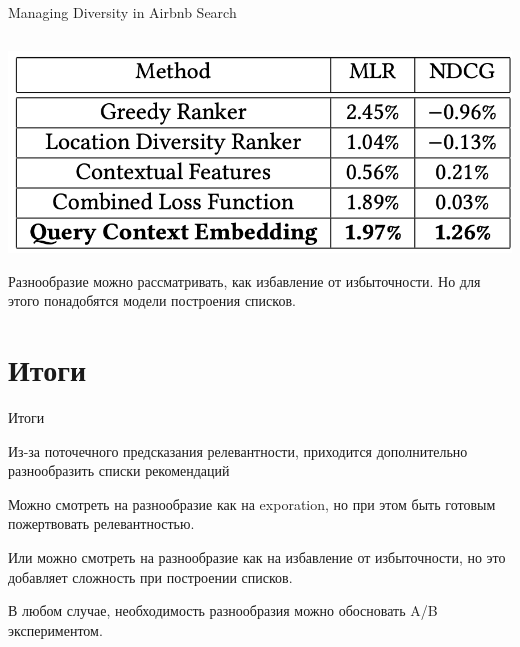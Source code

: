 \documentclass[11pt,aspectratio=169,handout]{beamer}
\begin{document}
\begin{frame}{Managing Diversity in Airbnb Search \cite{AIRBNB}}
\begin{columns}
\end{columns}

\begin{center}
\includegraphics[scale=0.2]{images/airbnb-res.png}
\end{center}

\end{frame}

\begin{frame}

\begin{tcolorbox}[colback=info!5,colframe=info!80,title=]
Разнообразие можно рассматривать, как избавление от избыточности. Но для этого понадобятся модели построения списков.
\end{tcolorbox}

\end{frame}

\section{Итоги}

\begin{frame}{Итоги}

\begin{tcolorbox}[colback=info!5,colframe=info!80,title=]
Из-за поточечного предсказания релевантности, приходится дополнительно разнообразить списки рекомендаций
\end{tcolorbox}

\begin{tcolorbox}[colback=info!5,colframe=info!80,title=]
Можно смотреть на разнообразие как на exporation, но при этом быть готовым пожертвовать релевантностью.
\end{tcolorbox}

\begin{tcolorbox}[colback=info!5,colframe=info!80,title=]
Или можно смотреть на разнообразие как на избавление от избыточности, но это добавляет сложность при построении списков.
\end{tcolorbox}

\begin{tcolorbox}[colback=info!5,colframe=info!80,title=]
В любом случае, необходимость разнообразия можно обосновать A/B экспериментом.
\end{tcolorbox}

\end{frame}
\end{document}
